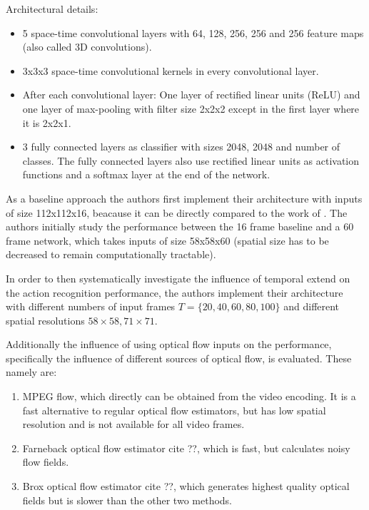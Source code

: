 Architectural details:

\begin{itemize}
    \item 5 space-time convolutional layers with 64, 128, 256, 256 and 256 feature maps (also called 3D convolutions).
    \item 3x3x3 space-time convolutional kernels in every convolutional layer.
    \item After each convolutional layer: One layer of rectified linear units (ReLU) and one layer of max-pooling with filter size 2x2x2 except in the first layer where it is 2x2x1.
    \item 3 fully connected layers as classifier with sizes 2048, 2048 and number of classes.
        The fully connected layers also use rectified linear units as activation functions and a softmax layer at the end of the network.
\end{itemize}

As a baseline approach the authors first implement their architecture with inputs of size 112x112x16, beacause it can be directly compared to the work of \textcite{tran_learning_2015}.
The authors initially study the performance between the 16 frame baseline and a 60 frame network, which takes inputs of size 58x58x60 (spatial size has to be decreased to remain computationally tractable).

In order to then systematically investigate the influence of temporal extend on the action recognition performance, the authors implement their architecture with different numbers of input frames $T = \{20, 40, 60, 80, 100\}$ and different spatial resolutions ${58 \times 58, 71 \times 71}$.

Additionally the influence of using optical flow inputs on the performance, specifically the influence of different sources of optical flow, is evaluated. These namely are:
\begin{enumerate}
    \item MPEG flow, which directly can be obtained from the video encoding. It is a fast alternative to regular optical flow estimators, but has low spatial resolution and is not available for all video frames.
    \item Farneback optical flow estimator cite ??, which is fast, but calculates noisy flow fields.
    \item Brox optical flow estimator cite ??, which generates highest quality optical fields but is slower than the other two methods.
\end{enumerate}


